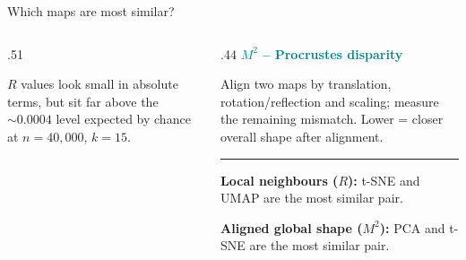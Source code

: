 \documentclass[aspectratio=169,10pt]{beamer}
\newcommand{\slidelabel}{SSBI}
\begin{document}
\begin{frame}{Which maps are most similar?}
  \begin{columns}[c,onlytextwidth]
  \begin{column}{.51\textwidth}
    \begin{center}
      \small\par\smallskip
      {\scriptsize $R$ values look small in absolute terms, but sit far above the $\sim0.0004$ level expected by chance at $n=40{,}000$, $k=15$.}
    \end{center}
    \par\medskip
  
  \end{column}
  \begin{column}{.44\textwidth}
      \textcolor{Teal}{\textbf{$M^2$ -- Procrustes disparity}}\par\smallskip
    \small Align two maps by translation, rotation/reflection and scaling; measure the remaining mismatch. Lower = closer overall shape after alignment.\par
    \vspace{5pt}\hrule\vspace{5pt}
    \textbf{Local neighbours ($R$):} t-SNE and UMAP are the most similar pair.\par\medskip
    \textbf{Aligned global shape ($M^2$):} PCA and t-SNE are the most similar pair. \par \medskip
  \end{column}
  \end{columns}
\end{frame}

\renewcommand{\slidelabel}{SSBI · Task 3}
\end{document}

